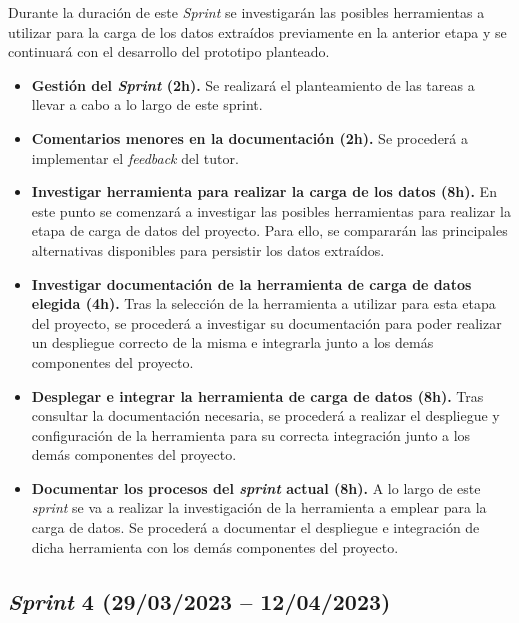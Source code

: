 Durante la duración de este \textit{Sprint} se investigarán las posibles herramientas a utilizar para la carga de los datos extraídos previamente en la anterior etapa y se continuará con el desarrollo del prototipo planteado.

\begin{itemize}

    \item \textbf{Gestión del \textit{Sprint} (2h).} Se realizará el planteamiento de las tareas a llevar a cabo a lo largo de este sprint.

    \item \textbf{Comentarios menores en la documentación (2h).} Se procederá a implementar el \textit{feedback} del tutor.

    \item \textbf{Investigar herramienta para realizar la carga de los datos (8h).} En este punto se comenzará a investigar las posibles herramientas para realizar la etapa de carga de datos del proyecto. Para ello, se compararán las principales alternativas disponibles para persistir los datos extraídos.

    \item \textbf{Investigar documentación de la herramienta de carga de datos elegida (4h).} Tras la selección de la herramienta a utilizar para esta etapa del proyecto, se procederá a investigar su documentación para poder realizar un despliegue correcto de la misma e integrarla junto a los demás componentes del proyecto.

    \item \textbf{Desplegar e integrar la herramienta de carga de datos (8h).} Tras consultar la documentación necesaria, se procederá a realizar el despliegue y configuración de la herramienta para su correcta integración junto a los demás componentes del proyecto.

    \item \textbf{Documentar los procesos del \textit{sprint} actual (8h).} A lo largo de este \textit{sprint} se va a realizar la investigación de la herramienta a emplear para la carga de datos. Se procederá a documentar el despliegue e integración de dicha herramienta con los demás componentes del proyecto.

\end{itemize}




\subsection{\textit{Sprint} 4 (29/03/2023 -- 12/04/2023)}

